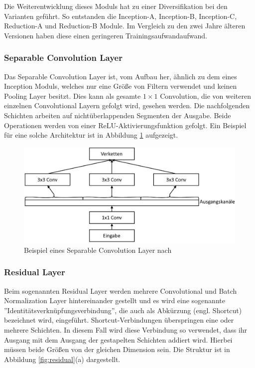 \mypar Die Weiterentwicklung dieses Moduls hat zu einer Diversifikation bei den Varianten geführt. So entstanden die Inception-A, Inception-B, Inception-C, Reduction-A und Reduction-B Module. Im Vergleich zu den zwei Jahre älteren Versionen haben diese einen geringeren Trainingsaufwandaufwand. \cite{inception-inceptionresnet-and-the-impact-of-residual-connections-on-learning}


\subsubsection{Separable Convolution Layer}
Das Separable Convolution Layer ist, vom Aufbau her, ähnlich zu dem eines Inception Moduls, welches nur eine Größe von Filtern verwendet und keinen Pooling Layer besitzt. Dies kann als gesamte $1\times1$ Convolution, die von weiteren einzelnen Convolutional Layern gefolgt wird, gesehen werden. Die nachfolgenden Schichten arbeiten auf nichtüberlappenden Segmenten der Ausgabe. Beide Operationen werden von einer ReLU-Aktivierungsfunktion gefolgt. Ein Beispiel für eine solche Architektur ist in Abbildung \ref{fig:sep_conv} aufgezeigt. \cite{xception-dl-with-depthwise-sep-conv}

\begin{figure}[h!]
\centering
\includegraphics[width=12cm]{98_images/sep_conv.png}
\caption{Beispiel eines Separable Convolution Layer nach \cite{xception-dl-with-depthwise-sep-conv}}
\label{fig:sep_conv}
\end{figure}


\subsubsection{Residual Layer}
Beim sogenannten Residual Layer werden mehrere Convolutional und Batch Normalization Layer hintereinander gestellt und es wird eine sogenannte ''Identitätsverknüpfungsverbindung'', die auch als Abkürzung (engl. Shortcut) bezeichnet wird, eingeführt. Shortcut-Verbindungen überspringen eine oder mehrere Schichten. In diesem Fall wird diese Verbindung so verwendet, dass ihr Ausgang mit dem Ausgang der gestapelten Schichten addiert wird. Hierbei müssen beide Größen von der gleichen Dimension sein. Die Struktur ist in Abbildung \ref{fig:residual}(a) dargestellt. \cite{deep-residual-learning}

